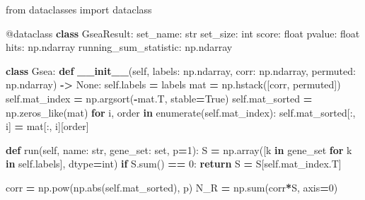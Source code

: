 \documentclass[
]{book}
\newenvironment{Shaded}{\begin{snugshade}}{\end{snugshade}}
\newcommand{\AttributeTok}[1]{\textcolor[rgb]{0.13,0.29,0.53}{#1}}
\newcommand{\BuiltInTok}[1]{#1}
\newcommand{\ControlFlowTok}[1]{\textcolor[rgb]{0.13,0.29,0.53}{\textbf{#1}}}
\newcommand{\DecValTok}[1]{\textcolor[rgb]{0.00,0.00,0.81}{#1}}
\newcommand{\FunctionTok}[1]{\textcolor[rgb]{0.13,0.29,0.53}{\textbf{#1}}}
\newcommand{\ImportTok}[1]{#1}
\newcommand{\KeywordTok}[1]{\textcolor[rgb]{0.13,0.29,0.53}{\textbf{#1}}}
\newcommand{\NormalTok}[1]{#1}
\newcommand{\OperatorTok}[1]{\textcolor[rgb]{0.81,0.36,0.00}{\textbf{#1}}}
\newcommand{\VariableTok}[1]{\textcolor[rgb]{0.00,0.00,0.00}{#1}}
\begin{document}
\begin{Shaded}
\begin{Highlighting}[numbers=left,,]
\ImportTok{from}\NormalTok{ dataclasses }\ImportTok{import}\NormalTok{ dataclass}

\AttributeTok{@dataclass}
\KeywordTok{class}\NormalTok{ GseaResult:}
\NormalTok{    set\_name: }\BuiltInTok{str}
\NormalTok{    set\_size: }\BuiltInTok{int}
\NormalTok{    score: }\BuiltInTok{float}
\NormalTok{    pvalue: }\BuiltInTok{float}
\NormalTok{    hits: np.ndarray}
\NormalTok{    running\_sum\_statistic: np.ndarray}

\KeywordTok{class}\NormalTok{ Gsea:}
    \KeywordTok{def} \FunctionTok{\_\_init\_\_}\NormalTok{(}\VariableTok{self}\NormalTok{, labels: np.ndarray, corr: np.ndarray, permuted: np.ndarray) }\OperatorTok{{-}\textgreater{}} \VariableTok{None}\NormalTok{:}
        \VariableTok{self}\NormalTok{.labels }\OperatorTok{=}\NormalTok{ labels}
\NormalTok{        mat }\OperatorTok{=}\NormalTok{ np.hstack([corr, permuted])}
        \VariableTok{self}\NormalTok{.mat\_index }\OperatorTok{=}\NormalTok{ np.argsort(}\OperatorTok{{-}}\NormalTok{mat.T, stable}\OperatorTok{=}\VariableTok{True}\NormalTok{)}
        \VariableTok{self}\NormalTok{.mat\_sorted }\OperatorTok{=}\NormalTok{ np.zeros\_like(mat)}
        \ControlFlowTok{for}\NormalTok{ i, order }\KeywordTok{in} \BuiltInTok{enumerate}\NormalTok{(}\VariableTok{self}\NormalTok{.mat\_index):}
            \VariableTok{self}\NormalTok{.mat\_sorted[:, i] }\OperatorTok{=}\NormalTok{ mat[:, i][order]}

    \KeywordTok{def}\NormalTok{ run(}\VariableTok{self}\NormalTok{, name: }\BuiltInTok{str}\NormalTok{, gene\_set: }\BuiltInTok{set}\NormalTok{, p}\OperatorTok{=}\DecValTok{1}\NormalTok{):}
\NormalTok{        S }\OperatorTok{=}\NormalTok{ np.array([k }\KeywordTok{in}\NormalTok{ gene\_set }\ControlFlowTok{for}\NormalTok{ k }\KeywordTok{in} \VariableTok{self}\NormalTok{.labels], dtype}\OperatorTok{=}\BuiltInTok{int}\NormalTok{)}
        \ControlFlowTok{if}\NormalTok{ S.}\BuiltInTok{sum}\NormalTok{() }\OperatorTok{==} \DecValTok{0}\NormalTok{: }\ControlFlowTok{return}
\NormalTok{        S }\OperatorTok{=}\NormalTok{ S[}\VariableTok{self}\NormalTok{.mat\_index.T]}

\NormalTok{        corr }\OperatorTok{=}\NormalTok{ np.}\BuiltInTok{pow}\NormalTok{(np.}\BuiltInTok{abs}\NormalTok{(}\VariableTok{self}\NormalTok{.mat\_sorted), p)}
\NormalTok{        N\_R }\OperatorTok{=}\NormalTok{ np.}\BuiltInTok{sum}\NormalTok{(corr}\OperatorTok{*}\NormalTok{S, axis}\OperatorTok{=}\DecValTok{0}\NormalTok{)}


\end{Highlighting}
\end{Shaded}
\end{document}
